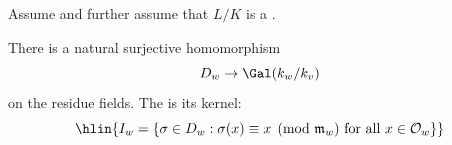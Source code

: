 \begin{definition} \label{definition:inertia_group_of_a_finite_galois_extension_of_valuation_fields}
    Assume  and further assume that $L/K$ is a  .

    There is a natural surjective homomorphism 
    $$D_w \to \Gal(k_w / k_v)$$
    on the residue fields. The  is its kernel: 
    $$\hlin{I_w = \{\sigma \in D_w : \sigma(x) \equiv x \pmod{\mathfrak{m}_w} \text{ for all } x \in \mathcal{O}_w\}}$$
\end{definition}